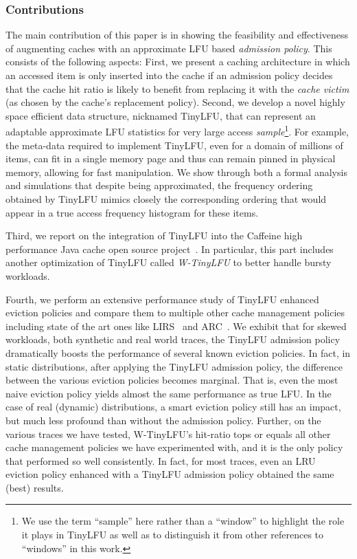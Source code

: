 \documentclass[10pt,a4paper]{article}
\begin{document}
\subsubsection*{Contributions}
The main contribution of this paper is in showing the feasibility and effectiveness of augmenting caches with an approximate LFU based \emph{admission policy}.
This consists of the following aspects:
First, we present a caching architecture in which an accessed item is only inserted into the cache if an admission policy decides that the cache hit ratio is likely to benefit from
replacing it with the \emph{cache victim} (as chosen by the cache's replacement policy).
Second, we develop a novel highly space efficient data structure, nicknamed TinyLFU, that can represent an adaptable approximate LFU statistics for very large access \emph{sample}\footnote{
We use the term ``sample'' here rather than a ``window'' to highlight the role it plays in TinyLFU as well as to distinguish it from other references to ``windows'' in this work.
}.
For example, the meta-data required to implement TinyLFU, even for a domain of millions of items, can fit in a single memory page and thus can remain pinned in physical memory, allowing for fast manipulation.
We show through both a formal analysis and simulations that despite being approximated, the frequency ordering obtained by TinyLFU mimics closely the corresponding ordering that would appear in a true
access frequency histogram for these items.

Third, we report on the integration of TinyLFU into the Caffeine high performance Java cache open source project~\cite{CaffeineProject}.
In particular, this part includes another optimization of TinyLFU called \emph{W-TinyLFU} to better handle bursty workloads.

Fourth, we perform an extensive performance study of TinyLFU enhanced eviction policies and compare them to multiple other cache management policies including state of the art ones like LIRS~\cite{LIRS} and ARC~\cite{ARC,ARCpatent}.
We exhibit that for skewed workloads, both synthetic and real world traces, the TinyLFU admission policy dramatically boosts the performance of several known eviction policies.
In fact, in static distributions, after applying the TinyLFU admission policy, the difference between the various eviction policies becomes marginal.
That is, even the most naive eviction policy yields almost the same performance as true LFU.
In the case of real (dynamic) distributions, a smart eviction policy still has an impact, but much less profound than without the admission policy.
Further, on the various traces we have tested, W-TinyLFU's hit-ratio tops or equals all other cache management policies we have experimented with, and it is the only policy that performed so well consistently.
In fact, for most traces, even an LRU eviction policy enhanced with a TinyLFU admission policy obtained the same (best) results.
\end{document}
